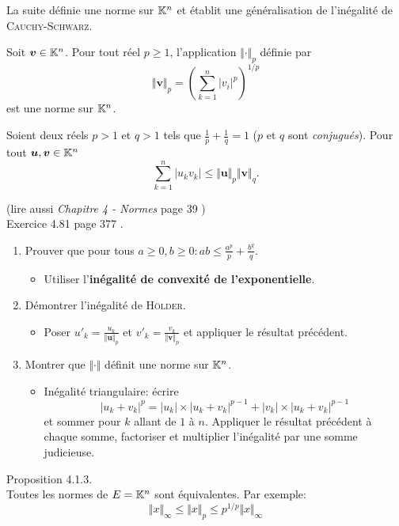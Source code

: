 La suite définie une norme sur $\mathbb{K}^n$ et établit une généralisation de l'inégalité de \textsc{Cauchy}-\textsc{Schwarz}. 
\begin{defi}
    Soit $\bm{v} \in \mathbb{K}^n$. Pour tout réel $p \geqslant 1$, l'application $\Vert \bm{\cdot} \Vert_p$ définie par
    $$\Vert \bm{v} \Vert_p = \left (\sum_{k=1}^{n} |v_i|^p \right)^{1/p}$$
    est une norme sur $\mathbb{K}^n$.
\end{defi}

\begin{prop}
    Soient deux réels $p > 1$ et $q > 1$ tels que $\frac{1}{p} + \frac{1}{q} = 1$ ($p$ et $q$ sont \emph{conjugués}). Pour tout $\bm{u}, \bm{v} \in \mathbb{K}^n$
    $$\sum_{k=1}^{n} |u_k v_k| \leqslant \Vert \bm{u} \Vert_p \Vert \bm{v} \Vert_q.$$
\end{prop}

\begin{preuve}(lire aussi \emph{Chapitre 4 - Normes} page 39 \cite{matrices}) \\
    Exercice 4.81 page 377 \cite{oraux_x_ens_3}.
    \begin{enumerate}
        \item Prouver que pour tous $a \geqslant 0, b \geqslant 0: ab \leqslant \frac{a^p}{p} + \frac{b^q}{q}$.
        \begin{itemize}
            \item Utiliser l'\textbf{inégalité de convexité de l'exponentielle}.
        \end{itemize}
        \item Démontrer l'inégalité de \textsc{Hölder}.
        \begin{itemize}
            \item Poser $u'_k = \frac{u_k}{\Vert \bm{u} \Vert_p}$ et $v'_k = \frac{v_k}{\Vert \bm{v} \Vert_p}$ et appliquer le résultat précédent. 
        \end{itemize}
        \item Montrer que $\Vert \bm{\cdot} \Vert$ définit une norme sur $\mathbb{K}^n$.
        \begin{itemize}
            \item Inégalité triangulaire: écrire 
            $$|u_k + v_k|^p = |u_k| \times |u_k + v_k|^{p-1} + |v_k| \times |u_k + v_k|^{p-1}$$ 
            et sommer pour $k$ allant de $1$ à $n$. Appliquer le résultat précédent à chaque somme, factoriser et multiplier l'inégalité par une somme judicieuse. 
        \end{itemize}
    \end{enumerate}
\end{preuve}     

\begin{prop}
    Proposition 4.1.3. \cite{matrices} \\
    Toutes les normes de $E = \mathbb{K}^n$ sont équivalentes. Par exemple:
    $$\Vert x \Vert_\infty \leqslant \Vert x \Vert_p \leqslant p^{1/p} \Vert x \Vert_\infty$$
\end{prop}

